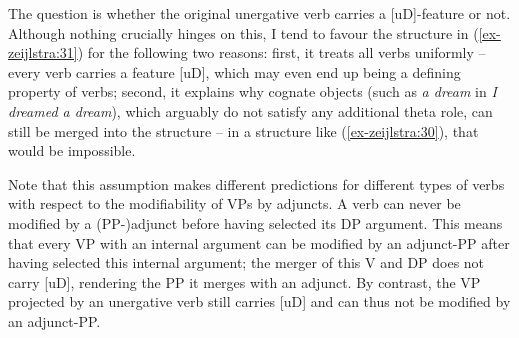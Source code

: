 \documentclass[output=paper
,modfonts
,nonflat]{langsci/langscibook}
\begin{document}
\begin{figure}[!h]
	\begin{exe}
	\end{exe} \vspace{-0.7cm}
\end{figure}
\begin{figure}[!h]
	\begin{exe}
	\end{exe} \vspace{-0.9cm}
\end{figure}
\newpage \noindent The question is whether the original unergative verb carries a [uD]-feature or not. Although nothing crucially hinges on this, I tend to favour the structure in (\ref{ex-zeijlstra:31}) for the following two reasons: first, it treats all verbs uniformly – every verb carries a feature [uD], which may even end up being a defining property of verbs; second, it explains why cognate objects (such as \textit{a dream} in \textit{I dreamed a dream}), which arguably do not satisfy any additional theta role, can still be merged into the structure – in a structure like (\ref{ex-zeijlstra:30}), that would be impossible.

Note that this assumption makes different predictions for different types of verbs with respect to the modifiability of VPs by adjuncts. A verb can never be modified by a (PP-)adjunct before having selected its DP argument. This means that every VP with an internal argument can be modified by an adjunct-PP after having selected this internal argument; the merger of this V and DP does not carry [uD], rendering the PP it merges with an adjunct. By contrast, the VP projected by an unergative verb still carries [uD] and can thus not be modified by an adjunct-PP. 
\end{document}

